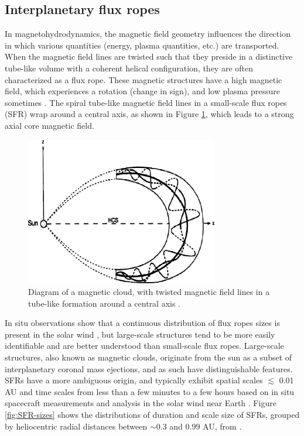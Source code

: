 

\subsection{Interplanetary flux ropes}
In magnetohydrodynamics, the magnetic field geometry influences the direction in which various quantities (energy, plasma quantities, etc.) are transported. When the magnetic field lines are twisted such that they preside in a distinctive tube-like volume with a coherent helical configuration, they are often characterized as a flux rope. These magnetic structures have a high magnetic field, which experiences a rotation (change in sign), and low plasma pressure sometimes \citep{Cartwright:2008}. The spiral tube-like magnetic field lines in a small-scale flux ropes (\gls{SFR}) wrap around a central axis, as shown in Figure \ref{fig:FR-diagram}, which leads to a strong axial core magnetic field.

\begin{figure}[ht!]
    \centering
    \includegraphics[width=0.75\textwidth]{Figures/fluxrope.png}
    \caption{Diagram of a magnetic cloud, with twisted magnetic field lines in a tube-like formation around a central axis \citep{Feng:2007}.}
    \label{fig:FR-diagram}
\end{figure}

In situ observations show that a continuous distribution of flux ropes sizes is present in the solar wind \citep{Feng:2007, Hu:2018}, but large-scale structures tend to be more easily identifiable and are better understood than small-scale flux ropes. Large-scale structures, also known as magnetic clouds, originate from the sun as a subset of interplanetary coronal mass ejections, and as such have distinguishable features. SFRs have a more ambiguous origin, and typically exhibit spatial scales $\lesssim$ 0.01 AU and time scales from less than a few minutes to a few hours based on in situ spacecraft measurements and analysis in the solar wind near Earth \citep{Cartwright:2010, Feng:2007, Hu:2018}. Figure \ref{fig:SFR-sizes} shows the distributions of duration and scale size of SFRs, grouped by heliocentric radial distances between $\sim$0.3 and 0.99 AU, from \cite{ChenHu:2020}.

